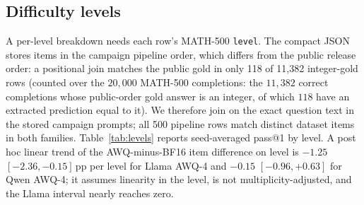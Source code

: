 \documentclass[11pt,a4paper]{article}
\begin{document}
\FloatBarrier
\subsection{Difficulty levels}
A per-level breakdown needs each row's MATH-500 \texttt{level}. The compact JSON stores items in the campaign pipeline order, which differs from the public release order: a positional join matches the public gold in only 118 of 11{,}382 integer-gold rows (counted over the $20{,}000$ MATH-500 completions: the $11{,}382$ correct completions whose public-order gold answer is an integer, of which $118$ have an extracted prediction equal to it). We therefore join on the exact question text in the stored campaign prompts; all 500 pipeline rows match distinct dataset items in both families.
Table~\ref{tab:levels} reports seed-averaged pass@1 by level. A post hoc linear trend of the AWQ-minus-BF16 item difference on level is $-1.25$ $[-2.36,-0.15]$\,pp per level for Llama AWQ-4 and $-0.15$ $[-0.96,+0.63]$ for Qwen AWQ-4; it assumes linearity in the level, is not multiplicity-adjusted, and the Llama interval nearly reaches zero.
\end{document}

